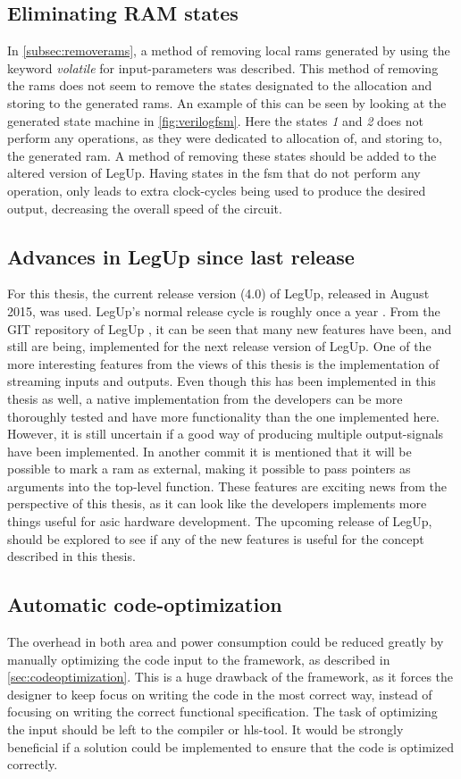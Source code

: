 \subsection{Eliminating RAM states}
In \cref{subsec:removerams}, a method of removing local \gls{ram}s generated by using the keyword \textit{volatile} for input-parameters was described. This method of removing the \gls{ram}s does not seem to remove the states designated to the allocation and storing to the generated \gls{ram}s. An example of this can be seen by looking at the generated state machine in \cref{fig:verilogfsm}. Here the states \textit{1} and \textit{2} does not perform any operations, as they were dedicated to allocation of, and storing to, the generated \gls{ram}. A method of removing these states should be added to the altered version of LegUp. Having states in the \gls{fsm} that do not perform any operation, only leads to extra clock-cycles being used to produce the desired output, decreasing the overall speed of the circuit.

\subsection{Advances in LegUp since last release}
For this thesis, the current release version (4.0) of LegUp, released in August 2015, was used. LegUp's normal release cycle is roughly once a year \cite{legupfaq}. From the GIT repository of LegUp \cite{legupgit}, it can be seen that many new features have been, and still are being, implemented for the next release version of LegUp. One of the more interesting features from the views of this thesis is the implementation of streaming inputs and outputs. Even though this has been implemented in this thesis as well, a native implementation from the developers can be more thoroughly tested and have more functionality than the one implemented here. However, it is still uncertain if a good way of producing multiple output-signals have been implemented. In another commit it is mentioned that it will be possible to mark a \gls{ram} as external, making it possible to pass pointers as arguments into the top-level function. These features are exciting news from the perspective of this thesis, as it can look like the developers implements more things useful for \gls{asic} hardware development. The upcoming release of LegUp, should be explored to see if any of the new features is useful for the concept described in this thesis. 

\subsection{Automatic code-optimization}
The overhead in both area and power consumption could be reduced greatly by manually optimizing the code input to the framework, as described in \cref{sec:codeoptimization}. This is a huge drawback of the framework, as it forces the designer to keep focus on writing the code in the most correct way, instead of focusing on writing the correct functional specification. The task of optimizing the input should be left to the compiler or \gls{hls}-tool. It would be strongly beneficial if a solution could be implemented to ensure that the code is optimized correctly.

